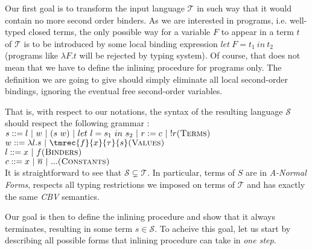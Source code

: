 \documentclass[a4paper,11pt,oneside]{article}
\theoremstyle{plain}
\newcommand{\tmlet}[3]{let~#1=#2~in~#3}
\newcommand{\inlT}{\mathcal{T}}
\newcommand{\inlS}{\mathcal{S}}
\begin{document}
Our first goal is to transform the input language $\inlT$ in such way that it
would contain no more second order binders. As we are interested in programs, 
i.e. well-typed closed terms, the only possible way for a variable $F$ to 
appear in a term $t$ of $\inlT$ is to be introduced by some local binding 
expression $\tmlet{F}{t_1}{t_2}$ (programs like $\lambda F. t$ will be
rejected by typing system). Of course, that does not mean that we have to define 
the inlining procedure for programs only. The definition we are going to give
should simply eliminate all local second-order bindings, ignoring the eventual
free second-order variables.

That is, with respect to our notations, the syntax of the resulting language
 $\inlS$ should respect the following grammar :\\[1em]\indent 
  $ s ::= l~|~w~|~(s~w) ~|~ \tmlet{l}{s_1}{s_2} ~|~ r:= c ~|~ !r \hfill \textsc{(Terms)}$ \\\indent 
  $ w ::= \lambda l. s ~|~ \tmrec{f}{x}{\tau}{s}\hfill \textsc{(Values)}$ \\\indent 
  $ l ::= x ~|~ f \hfill \textsc{(Binders)}$ \\\indent 
  $ c ::= x ~|~ \overline{n}~|~... \hfill \textsc{(Constants)}$\\[1em]

It is straightforward to see that $\inlS \subsetneq \inlT$. In particular,
terms of $S$ are in \textit{A-Normal Forms}, respects all typing restrictions 
we imposed on terms of $\inlT$ and has exactly the same \textit{CBV} semantics. 

Our goal is then to define the inlining procedure and show that it always terminates, resulting in some term $s \in \inlS$. 
To acheive this goal, let us start by describing all possible forms that inlining procedure can take in  \textit{one step}.
\end{document}
